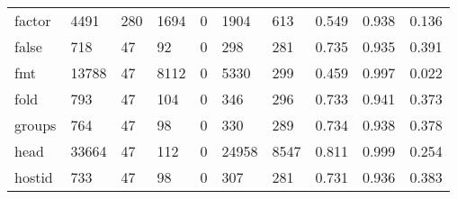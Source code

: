 \begin{longtable}{lp{2.0cm}p{2.0cm}p{2.0cm}p{2.0cm}p{2.0cm}p{2.0cm}p{2.0cm}p{2.0cm}p{2.0cm}}
factor    &                   4491 &                                280 &                              1694 &                                0 &                              1904 &                             613 &                                0.549 &                                  0.938 &                                0.136 \\
false     &                    718 &                                 47 &                                92 &                                0 &                               298 &                             281 &                                0.735 &                                  0.935 &                                0.391 \\
fmt       &                  13788 &                                 47 &                              8112 &                                0 &                              5330 &                             299 &                                0.459 &                                  0.997 &                                0.022 \\
fold      &                    793 &                                 47 &                               104 &                                0 &                               346 &                             296 &                                0.733 &                                  0.941 &                                0.373 \\
groups    &                    764 &                                 47 &                                98 &                                0 &                               330 &                             289 &                                0.734 &                                  0.938 &                                0.378 \\
head      &                  33664 &                                 47 &                               112 &                                0 &                             24958 &                            8547 &                                0.811 &                                  0.999 &                                0.254 \\
hostid    &                    733 &                                 47 &                                98 &                                0 &                               307 &                             281 &                                0.731 &                                  0.936 &                                0.383 \\

\end{longtable}
